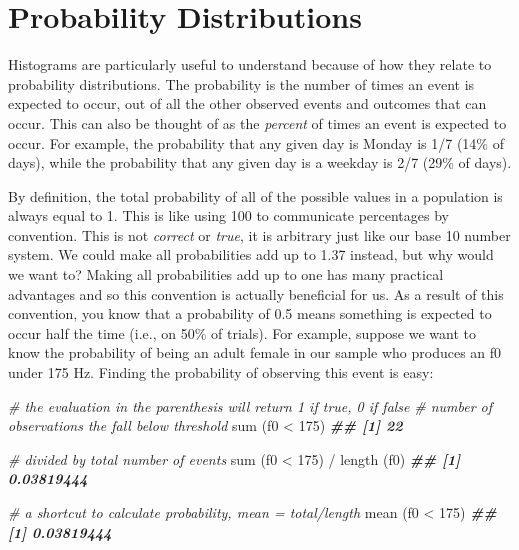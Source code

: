 \documentclass[
]{book}
\newenvironment{Shaded}{\begin{snugshade}}{\end{snugshade}}
\newcommand{\CommentTok}[1]{\textcolor[rgb]{0.56,0.35,0.01}{\textit{#1}}}
\newcommand{\DecValTok}[1]{\textcolor[rgb]{0.00,0.00,0.81}{#1}}
\newcommand{\DocumentationTok}[1]{\textcolor[rgb]{0.56,0.35,0.01}{\textbf{\textit{#1}}}}
\newcommand{\FunctionTok}[1]{\textcolor[rgb]{0.00,0.00,0.00}{#1}}
\newcommand{\NormalTok}[1]{#1}
\newcommand{\SpecialCharTok}[1]{\textcolor[rgb]{0.00,0.00,0.00}{#1}}
\begin{document}
\hypertarget{probability-distributions}{%
\section{Probability Distributions}\label{probability-distributions}}

Histograms are particularly useful to understand because of how they relate to probability distributions. The probability is the number of times an event is expected to occur, out of all the other observed events and outcomes that can occur. This can also be thought of as the \emph{percent} of times an event is expected to occur. For example, the probability that any given day is Monday is 1/7 (14\% of days), while the probability that any given day is a weekday is 2/7 (29\% of days).

By definition, the total probability of all of the possible values in a population is always equal to 1. This is like using 100 to communicate percentages by convention. This is not \emph{correct} or \emph{true}, it is arbitrary just like our base 10 number system. We could make all probabilities add up to 1.37 instead, but why would we want to? Making all probabilities add up to one has many practical advantages and so this convention is actually beneficial for us. As a result of this convention, you know that a probability of 0.5 means something is expected to occur half the time (i.e., on 50\% of trials). For example, suppose we want to know the probability of being an adult female in our sample who produces an f0 under 175 Hz. Finding the probability of observing this event is easy:

\begin{Shaded}
\begin{Highlighting}[]
\CommentTok{\# the evaluation in the parenthesis will return 1 if true, 0 if false}
\CommentTok{\# number of observations the fall below threshold}
\FunctionTok{sum}\NormalTok{ (f0 }\SpecialCharTok{\textless{}} \DecValTok{175}\NormalTok{)  }
\DocumentationTok{\#\# [1] 22}

\CommentTok{\# divided by total number of events}
\FunctionTok{sum}\NormalTok{ (f0 }\SpecialCharTok{\textless{}} \DecValTok{175}\NormalTok{) }\SpecialCharTok{/} \FunctionTok{length}\NormalTok{ (f0)  }
\DocumentationTok{\#\# [1] 0.03819444}

\CommentTok{\# a shortcut to calculate probability, mean = total/length}
\FunctionTok{mean}\NormalTok{ (f0 }\SpecialCharTok{\textless{}} \DecValTok{175}\NormalTok{)}
\DocumentationTok{\#\# [1] 0.03819444}
\end{Highlighting}
\end{Shaded}
\end{document}
